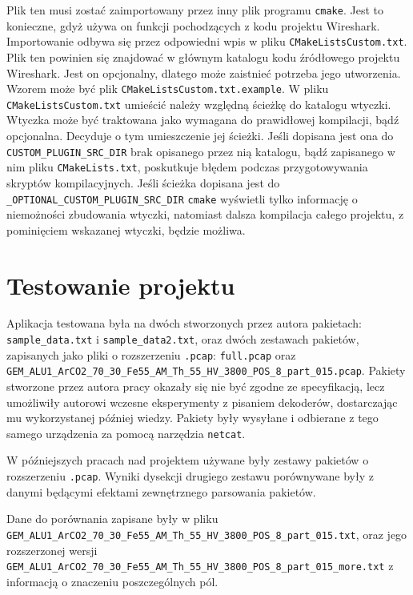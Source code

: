 \documentclass[a4paper, 12pt, twoside, openright]{article}
\begin{document}
	Plik ten musi zostać zaimportowany przez inny plik programu \texttt{cmake}. Jest to konieczne, gdyż używa on funkcji pochodzących z kodu projektu Wireshark.
	Importowanie odbywa się przez odpowiedni wpis w pliku \texttt{CMakeListsCustom.txt}. Plik ten powinien się znajdować w głównym katalogu kodu źródłowego
	projektu Wireshark. Jest on opcjonalny, dlatego może zaistnieć potrzeba jego utworzenia. Wzorem może być plik \texttt{CMakeListsCustom.txt.example}.
	W pliku \texttt{CMakeListsCustom.txt} umieścić należy względną ścieżkę do katalogu wtyczki. Wtyczka może być traktowana jako wymagana do prawidłowej kompilacji, bądź opcjonalna.
	Decyduje o tym umieszczenie jej ścieżki. Jeśli dopisana jest ona do \texttt{CUSTOM\_PLUGIN\_SRC\_DIR} brak opisanego przez nią katalogu, bądź zapisanego w nim pliku \texttt{CMakeLists.txt},
	poskutkuje błędem podczas przygotowywania skryptów kompilacyjnych. Jeśli ścieżka dopisana jest do \texttt{\_OPTIONAL\_CUSTOM\_PLUGIN\_SRC\_DIR} \texttt{cmake}
	wyświetli tylko informację o niemożności zbudowania wtyczki, natomiast dalsza kompilacja całego projektu, z pominięciem wskazanej wtyczki, będzie możliwa.

\newpage
\section{Testowanie projektu}

	Aplikacja testowana była na dwóch stworzonych przez autora pakietach: \texttt{sample\_data.txt}
	i \texttt{sample\_data2.txt}, oraz dwóch zestawach pakietów, zapisanych jako pliki o rozszerzeniu \texttt{.pcap}:
	\texttt{full.pcap} oraz \texttt{GEM\_ALU1\_ArCO2\_70\_30\_Fe55\_AM\_Th\_55\_HV\_3800\_POS\_8\_part\_015.pcap}.
	Pakiety stworzone przez autora pracy okazały się nie być zgodne ze specyfikacją, lecz umożliwiły autorowi
	wczesne eksperymenty z pisaniem dekoderów, dostarczając mu wykorzystanej później wiedzy. Pakiety były wysyłane
	i odbierane z tego samego urządzenia za pomocą narzędzia \texttt{netcat}.

	W późniejszych pracach nad projektem używane były zestawy pakietów o rozszerzeniu \texttt{.pcap}.
	Wyniki dysekcji drugiego zestawu porównywane były z danymi będącymi efektami zewnętrznego parsowania pakietów.

	Dane do porównania zapisane były w pliku \texttt{GEM\_ALU1\_ArCO2\_70\_30\_Fe55\_AM\_Th\_55\_HV\_3800\_POS\_8\_part\_015.txt}, oraz
	jego rozszerzonej wersji \texttt{GEM\_ALU1\_ArCO2\_70\_30\_Fe55\_AM\_Th\_55\_HV\_3800\_POS\_8\_part\_015\_more.txt}
	z informacją o znaczeniu poszczególnych pól.
\end{document}
